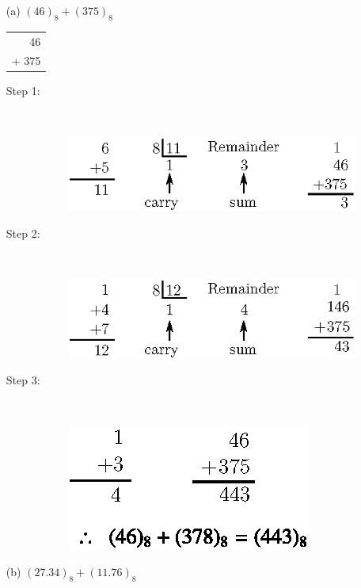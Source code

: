 \begin{solution}
\begin{itemize}
\item[(a)] $(46)_{8}+(375)_{8}$

\begin{tabular}{r}
46\\
+ 375\\
\hline
\end{tabular}
\begin{description}
\item[Step 1:]
~
\begin{figure}[H]
\centering
\includegraphics{chap6/fig28.eps}
\end{figure}

\eject

\item[Step 2:]
~
\begin{figure}[H]
\centering
\includegraphics{chap6/fig29.eps}
\end{figure}

\item[Step 3:]
~
\begin{figure}[H]
\centering
\includegraphics{chap6/fig30.eps}
\end{figure}
\end{description}

\item[(b)] $(27.34)_{8}+(11.76)_{8}$


\end{itemize}
\end{solution}
